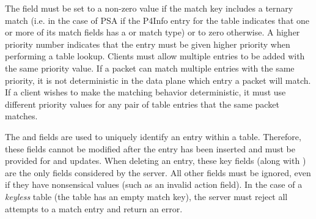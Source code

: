 \documentclass[11pt]{article}
\begin{document}
{%
\noindent{}The  field must be set to a non-zero value if the match key includes a
ternary match (i.e. in the case of PSA if the P4Info entry for the table
indicates that one or more of its match fields has a  or  match
type) or to zero otherwise. A higher priority number indicates that the entry
must be given higher priority when performing a table lookup. Clients must allow
multiple entries to be added with the same priority value.  If a packet can
match multiple entries with the same priority, it is not deterministic in the
data plane which entry a packet will match.  If a client wishes to make the
matching behavior deterministic, it must use different priority values for any
pair of table entries that the same packet matches.%

The  and  fields are used to uniquely identify an entry within
a table. Therefore, these fields cannot be modified after the entry has been
inserted and must be provided for  and  updates. When deleting
an entry, these key fields (along with ) are the only fields
considered by the server. All other fields must be ignored, even if they have
nonsensical values (such as an invalid action field). In the case of a \emph{keyless}
table (the table has an empty match key), the server must reject all attempts to
 a match entry and return an  error.%

}
\end{document}
